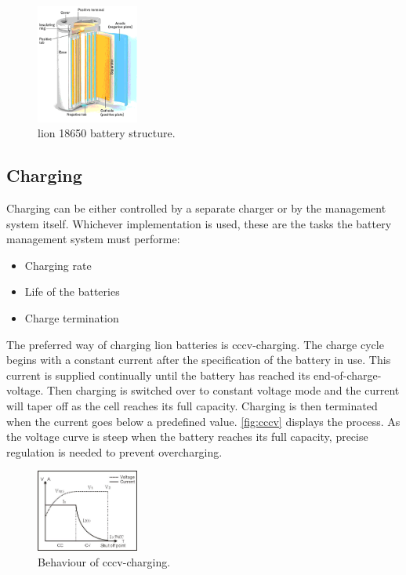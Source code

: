 \begin{figure}[H]
	\centering
	\includegraphics[width=0.3\textwidth]{Figures/cellstruct.png}
	\caption{\gls{lion} 18650 battery structure.}
	\label{fig:cellstruct}
\end{figure}

\subsection{Charging}
Charging can be either controlled by a separate charger or by the management system itself. Whichever implementation is used, these are the tasks the battery management system must performe\cite{book111}:

\begin{itemize}[noitemsep]
	\item Charging rate
	\item Life of the batteries
	\item Charge termination
\end{itemize}

The preferred way of charging \gls{lion} batteries is \gls{cccv}-charging. The charge cycle begins with a constant current after the specification of the battery in use. This current is supplied continually until the battery has reached its end-of-charge-voltage. Then charging is switched over to constant voltage mode and the current will taper off as the cell reaches its full capacity. Charging is then terminated when the current goes below a predefined value. \autoref{fig:cccv} displays the process. As the voltage curve is steep when the battery reaches its full capacity, precise regulation is needed to prevent overcharging\cite{cccv}\cite{book112}.

\begin{figure}[H]
	\centering
	\includegraphics[width=0.3\textwidth]{Figures/cccv.jpg}
	\caption{Behaviour of \gls{cccv}-charging.}
	\label{fig:cccv}
\end{figure}

